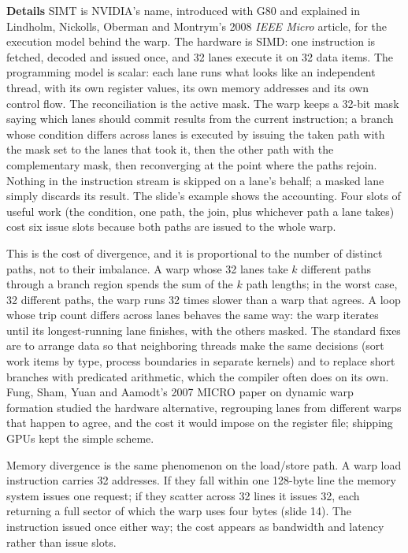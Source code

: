 \documentclass[11pt,letterpaper]{article}
\newcommand{\para}[1]{\medskip\noindent\textbf{#1}\quad}
\begin{document}
\para{Details} SIMT is NVIDIA's name, introduced with G80 and explained in Lindholm, Nickolls, Oberman and Montrym's 2008 \emph{IEEE Micro} article, for the execution model behind the warp. The hardware is SIMD: one instruction is fetched, decoded and issued once, and 32 lanes execute it on 32 data items. The programming model is scalar: each lane runs what looks like an independent thread, with its own register values, its own memory addresses and its own control flow. The reconciliation is the active mask. The warp keeps a 32-bit mask saying which lanes should commit results from the current instruction; a branch whose condition differs across lanes is executed by issuing the taken path with the mask set to the lanes that took it, then the other path with the complementary mask, then reconverging at the point where the paths rejoin. Nothing in the instruction stream is skipped on a lane's behalf; a masked lane simply discards its result. The slide's example shows the accounting. Four slots of useful work (the condition, one path, the join, plus whichever path a lane takes) cost six issue slots because both paths are issued to the whole warp.

This is the cost of divergence, and it is proportional to the number of distinct paths, not to their imbalance. A warp whose 32 lanes take $k$ different paths through a branch region spends the sum of the $k$ path lengths; in the worst case, 32 different paths, the warp runs 32 times slower than a warp that agrees. A loop whose trip count differs across lanes behaves the same way: the warp iterates until its longest-running lane finishes, with the others masked. The standard fixes are to arrange data so that neighboring threads make the same decisions (sort work items by type, process boundaries in separate kernels) and to replace short branches with predicated arithmetic, which the compiler often does on its own. Fung, Sham, Yuan and Aamodt's 2007 MICRO paper on dynamic warp formation studied the hardware alternative, regrouping lanes from different warps that happen to agree, and the cost it would impose on the register file; shipping GPUs kept the simple scheme.

Memory divergence is the same phenomenon on the load/store path. A warp load instruction carries 32 addresses. If they fall within one 128-byte line the memory system issues one request; if they scatter across 32 lines it issues 32, each returning a full sector of which the warp uses four bytes (slide 14). The instruction issued once either way; the cost appears as bandwidth and latency rather than issue slots.
\end{document}
